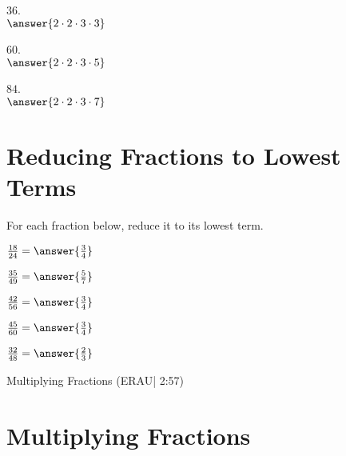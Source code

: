 \documentclass{ximera}
\begin{document}
\begin{problem}
$36$.\\
$\answer{2 \cdot 2 \cdot 3 \cdot 3}$
\end{problem}

\begin{problem}
$60$.\\
$\answer{2 \cdot 2 \cdot 3 \cdot 5}$
\end{problem}

\begin{problem}
$84$.\\
$\answer{2 \cdot 2 \cdot 3 \cdot 7}$
\end{problem}



\section*{Reducing Fractions to Lowest Terms}

For each fraction below, reduce it to its lowest term.

\begin{problem}
$\frac{18}{24} = \answer{\frac{3}{4}}$
\end{problem}

\begin{problem}
$\frac{35}{49} = \answer{\frac{5}{7}}$
\end{problem}

\begin{problem}
$\frac{42}{56} = \answer{\frac{3}{4}}$
\end{problem}

\begin{problem}
$\frac{45}{60} = \answer{\frac{3}{4}}$
\end{problem}

\begin{problem}
$\frac{32}{48} = \answer{\frac{2}{3}}$
\end{problem}


Multiplying Fractions (ERAU| 2:57)



\section*{Multiplying Fractions}
\end{document}
